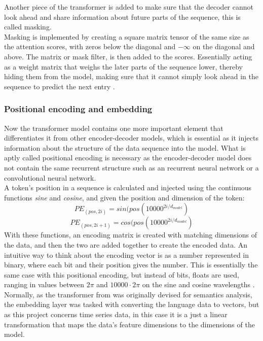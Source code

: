 \documentclass[main.tex]{subfiles}
\begin{document}
Another piece of the transformer is added to make sure that the decoder cannot look ahead and share information about future parts of the sequence, this is called masking.\\
Masking is implemented by creating a square matrix tensor of the same size as the attention scores, with zeros below the diagonal and $-\infty$ on the diagonal and above. The matrix or mask filter, is then added to the scores. Essentially acting as a weight matrix that weighs the later parts of the sequence lower, thereby hiding them from the model, making sure that it cannot simply look ahead in the sequence to predict the next entry \cite{HowToCodeTransformer}.

\subsubsection{Positional encoding and embedding}
Now the transformer model contains one more important element that differentiates it from other encoder-decoder models, which is essential as it injects information about the structure of the data sequence into the model. What is aptly called positional encoding is necessary as the encoder-decoder model does not contain the same recurrent structure such as an recurrent neural network or a convolutional neural network. \\
A token's position in a sequence is calculated and injected using the continuous functions \textit{sine} and \textit{cosine}, and given the position and dimension of the token:
$$PE_{(pos,2i)} = sin(pos(10000^{2i/d_{model}})$$
$$PE_{(pos,2i+1)} = cos(pos(10000^{2i/d_{model}})$$
With these functions, an encoding matrix is created with matching dimensions of the data, and then the two are added together to create the encoded data. An intuitive way to think about the encoding vector is as a number represented in binary, where each bit and their position gives the number. This is essentially the same case with this positional encoding, but instead of bits, floats are used, ranging in values between $2\pi$ and $10000 \cdot 2\pi$ on the sine and cosine wavelengths \cite{Positionalencoding}.\\
Normally, as the transformer from \cite{Attention} was originally devised for semantics analysis, the embedding layer was tasked with converting the language data to vectors, but as this project concerns time series data, in this case it is a just a linear transformation that maps the data's feature dimensions to the dimensions of the model.
\end{document}
